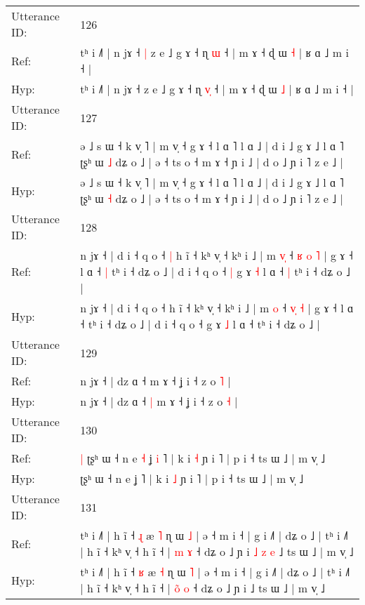 \documentclass[10pt]{article}
\DeclareRobustCommand{\hl}[1]{{\textcolor{red}{#1}}}
\begin{document}
\begin{longtable}{ll}
 \\
\midrule
Utterance ID: & 126 \\
Ref: & tʰ i ˩˥ | n jɤ ˧\hl{ }\hl{|} z e ˩ g ɤ ˧ ɳ \hl{}\hl{ɯ} ˧ | m ɤ ˧ ɖ ɯ \hl{˧} | ʁ ɑ ˩ m i ˧ |
 \\
Hyp: & tʰ i ˩˥ | n jɤ ˧\hl{}\hl{} z e ˩ g ɤ ˧ ɳ \hl{v}\hl{̩} ˧ | m ɤ ˧ ɖ ɯ \hl{˩} | ʁ ɑ ˩ m i ˧ |
 \\
\midrule
Utterance ID: & 127 \\
Ref: & ə ˩ s ɯ ˧ k v̩ ˥ | m v̩ ˧ g ɤ ˧ l ɑ ˥ l ɑ ˩ | d i ˩ g ɤ ˩ l ɑ ˥ ʈʂʰ ɯ \hl{˩} dʑ o ˩ | ə ˧ ts o ˧ m ɤ ˧ ɲ i ˩ | d o ˩ ɲ i ˥ z e ˩ |
 \\
Hyp: & ə ˩ s ɯ ˧ k v̩ ˥ | m v̩ ˧ g ɤ ˧ l ɑ ˥ l ɑ ˩ | d i ˩ g ɤ ˩ l ɑ ˥ ʈʂʰ ɯ \hl{˧} dʑ o ˩ | ə ˧ ts o ˧ m ɤ ˧ ɲ i ˩ | d o ˩ ɲ i ˥ z e ˩ |
 \\
\midrule
Utterance ID: & 128 \\
Ref: & n jɤ ˧ | d i ˧ q o ˧\hl{ }\hl{|} h ĩ ˧ kʰ v̩ ˧ kʰ i ˩ | m \hl{v}\hl{̩} ˧ \hl{ʁ}\hl{ }\hl{o} \hl{˥} | g ɤ ˧ l ɑ ˧\hl{ }\hl{|} tʰ i ˧ dʑ o ˩ | d i ˧ q o ˧\hl{ }\hl{|} g ɤ \hl{˧} l ɑ ˧\hl{ }\hl{|} tʰ i ˧ dʑ o ˩ |
 \\
Hyp: & n jɤ ˧ | d i ˧ q o ˧\hl{}\hl{} h ĩ ˧ kʰ v̩ ˧ kʰ i ˩ | m \hl{}\hl{o} ˧ \hl{}\hl{v}\hl{̩} \hl{˧} | g ɤ ˧ l ɑ ˧\hl{}\hl{} tʰ i ˧ dʑ o ˩ | d i ˧ q o ˧\hl{}\hl{} g ɤ \hl{˩} l ɑ ˧\hl{}\hl{} tʰ i ˧ dʑ o ˩ |
 \\
\midrule
Utterance ID: & 129 \\
Ref: & n jɤ ˧ | dz ɑ ˧\hl{}\hl{} m ɤ ˧ ʝ i ˧ z o \hl{˥} |
 \\
Hyp: & n jɤ ˧ | dz ɑ ˧\hl{ }\hl{|} m ɤ ˧ ʝ i ˧ z o \hl{˧} |
 \\
\midrule
Utterance ID: & 130 \\
Ref: & \hl{|}\hl{ }ʈʂʰ ɯ ˧ n e\hl{ }\hl{˧} ʝ\hl{ }\hl{i} ˥ | k i \hl{˧} ɲ i ˥ | p i ˧ ts ɯ ˩ | m v̩ ˩
 \\
Hyp: & \hl{}\hl{}ʈʂʰ ɯ ˧ n e\hl{}\hl{} ʝ\hl{}\hl{} ˥ | k i \hl{˩} ɲ i ˥ | p i ˧ ts ɯ ˩ | m v̩ ˩
 \\
\midrule
Utterance ID: & 131 \\
Ref: & tʰ i ˩˥ | h ĩ ˧ \hl{ɻ} æ \hl{˥} ɳ ɯ \hl{˩} | ə ˧ m i ˧ | g i ˩˥ | dʑ o ˩ | tʰ i ˩˥ | h ĩ ˧ kʰ v̩ ˧ h ĩ ˧ | \hl{}\hl{m} \hl{ɤ} ˧ dʑ o ˩ ɲ i\hl{ }\hl{˩}\hl{ }\hl{z}\hl{ }\hl{e} ˩ ts ɯ ˩ | m v̩ ˩
 \\
Hyp: & tʰ i ˩˥ | h ĩ ˧ \hl{ʁ} æ \hl{˧} ɳ ɯ \hl{˥} | ə ˧ m i ˧ | g i ˩˥ | dʑ o ˩ | tʰ i ˩˥ | h ĩ ˧ kʰ v̩ ˧ h ĩ ˧ | \hl{o}\hl{̃} \hl{o} ˧ dʑ o ˩ ɲ i\hl{}\hl{}\hl{}\hl{}\hl{}\hl{} ˩ ts ɯ ˩ | m v̩ ˩
 \\

\end{longtable}
\end{document}
